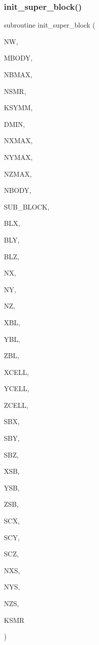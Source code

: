 \subsubsection{\texorpdfstring{init\+\_\+super\+\_\+block()}{init\_super\_block()}}
{\footnotesize\ttfamily subroutine init\+\_\+super\+\_\+block (\begin{DoxyParamCaption}\item[{integer}]{NW,  }\item[{integer}]{M\+B\+O\+DY,  }\item[{integer}]{N\+B\+M\+AX,  }\item[{integer}]{N\+S\+MR,  }\item[{integer}]{K\+S\+Y\+MM,  }\item[{real}]{D\+M\+IN,  }\item[{integer}]{N\+X\+M\+AX,  }\item[{integer}]{N\+Y\+M\+AX,  }\item[{integer}]{N\+Z\+M\+AX,  }\item[{integer}]{N\+B\+O\+DY,  }\item[{integer, dimension(mbody)}]{S\+U\+B\+\_\+\+B\+L\+O\+CK,  }\item[{real, dimension(nbmax,mbody)}]{B\+LX,  }\item[{real, dimension(nbmax,mbody)}]{B\+LY,  }\item[{real, dimension(nbmax,mbody)}]{B\+LZ,  }\item[{integer, dimension(nbmax,mbody)}]{NX,  }\item[{integer, dimension(nbmax,mbody)}]{NY,  }\item[{integer, dimension(nbmax,mbody)}]{NZ,  }\item[{real, dimension(nbmax,mbody)}]{X\+BL,  }\item[{real, dimension(nbmax,mbody)}]{Y\+BL,  }\item[{real, dimension(nbmax,mbody)}]{Z\+BL,  }\item[{real, dimension(nxmax,nbmax,mbody)}]{X\+C\+E\+LL,  }\item[{real, dimension(nymax,nbmax,mbody)}]{Y\+C\+E\+LL,  }\item[{real, dimension(nzmax,nbmax,mbody)}]{Z\+C\+E\+LL,  }\item[{real}]{S\+BX,  }\item[{real}]{S\+BY,  }\item[{real}]{S\+BZ,  }\item[{real}]{X\+SB,  }\item[{real}]{Y\+SB,  }\item[{real}]{Z\+SB,  }\item[{real}]{S\+CX,  }\item[{real}]{S\+CY,  }\item[{real}]{S\+CZ,  }\item[{integer}]{N\+XS,  }\item[{integer}]{N\+YS,  }\item[{integer}]{N\+ZS,  }\item[{integer}]{K\+S\+MR }\end{DoxyParamCaption})}

